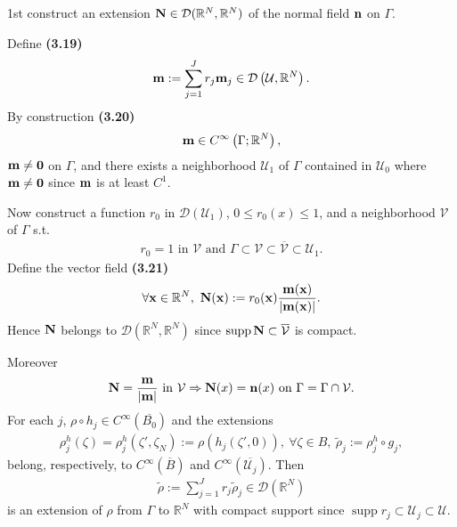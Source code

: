 \documentclass{book}
\numberwithin{equation}{section}
\begin{document}
\begin{enumerate}
\begin{enumerate}
        1st construct an extension ${\bf N}\in\mathcal{D}(\mathbb{R}^N,\mathbb{R}^N)$ of the normal field ${\bf n}$ on $\Gamma$.
        
        Define \textbf{(3.19)}
        \begin{align*}
            {\bf m} := \sum_{j=1}^J r_j{\bf m}_j\in\mathcal{D}\left(\mathcal{U},\mathbb{R}^N\right).
        \end{align*}
        By construction \textbf{(3.20)}
        \begin{align*}
            {\bf m}\in C^\infty\left(\Gamma;\mathbb{R}^N\right),
        \end{align*}
        ${\bf m}\ne{\bf 0}$ on $\Gamma$, and there exists a neighborhood $\mathcal{U}_1$ of $\Gamma$ contained in $\mathcal{U}_0$ where ${\bf m}\ne{\bf 0}$ since ${\bf m}$ is at least $C^1$.
        
        Now construct a function $r_0$ in $\mathcal{D}(\mathcal{U}_1)$, $0\le r_0(x)\le 1$, and a neighborhood $\mathcal{V}$ of $\Gamma$ s.t.
        \begin{align*}
            r_0 = 1 \mbox{ in } \mathcal{V} \mbox{ and } \Gamma\subset\mathcal{V}\subset\overline{\mathcal{V}}\subset\mathcal{U}_1.
        \end{align*}
        Define the vector field \textbf{(3.21)}
        \begin{align*}
            \forall{\bf x}\in\mathbb{R}^N,\ {\bf N}({\bf x}) := r_0({\bf x})\frac{{\bf m}({\bf x})}{\left|{\bf m}({\bf x})\right|}.
        \end{align*}
        Hence ${\bf N}$ belongs to $\mathcal{D}(\mathbb{R}^N,\mathbb{R}^N)$ since $\operatorname{supp}{\bf N}\subset\overline{\mathcal{V}}$ is compact.
        
        Moreover
        \begin{align*}
            {\bf N} = \frac{{\bf m}}{\left|{\bf m}\right|} \mbox{ in } \mathcal{V}\Rightarrow{\bf N}(x) = {\bf n}(x) \mbox{ on } \Gamma = \Gamma\cap\mathcal{V}.
        \end{align*}
        For each $j$, $\rho\circ h_j\in C^\infty(\overline{B_0})$ and the extensions
        \begin{align*}
            \rho_j^h(\zeta) = \rho_j^h(\zeta',\zeta_N) := \rho\left(h_j\left(\zeta',0\right)\right),\ \forall\zeta\in B,\ \tilde{\rho}_j := \rho_j^h\circ g_j,
        \end{align*}
        belong, respectively, to $C^\infty(\overline{B})$ and $C^\infty(\overline{\mathcal{U}_j})$. Then
        \begin{align*}
            \tilde{\rho} := \sum_{j=1}^J r_j\tilde{\rho}_j\in\mathcal{D}(\mathbb{R}^N)
        \end{align*}
        is an extension of $\rho$ from $\Gamma$ to $\mathbb{R}^N$ with compact support since $\operatorname{supp}r_j\subset\mathcal{U}_j\subset\mathcal{U}$.
        

\end{enumerate}
\end{enumerate}
\end{document}
